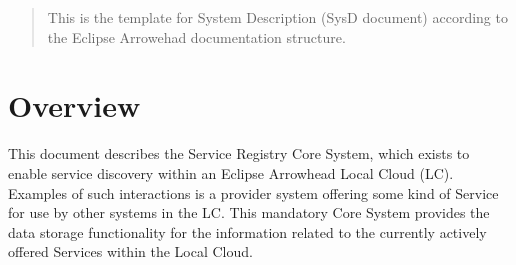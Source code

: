 \documentclass[a4paper]{arrowhead}
\begin{document}
\ArrowheadDate{\today}
\ArrowheadSetup

\begin{center}
  \vspace*{1cm}
  \huge{\arrowtitle}

  \vspace*{0.2cm}
  \LARGE{\arrowtype}
  \vspace*{1cm}

  \vspace*{\fill}


  \vspace*{1cm}
  \vspace*{\fill}

  \begin{abstract}
    This is the template for System Description (SysD document)
    according to the Eclipse Arrowehad documentation structure. 
  \end{abstract}

  \vspace*{1cm}

 \end{center}

\newpage

\tableofcontents
\newpage

\section{Overview}
\label{sec:overview}
\color{black}
This document describes the Service Registry Core System, which exists to enable service discovery within an Eclipse Arrowhead Local Cloud (LC). Examples of such interactions is a provider system offering some kind of Service for use by other systems in the LC. This mandatory Core System provides the data storage functionality for the information related to the currently actively offered Services within the Local Cloud.
\end{document}
